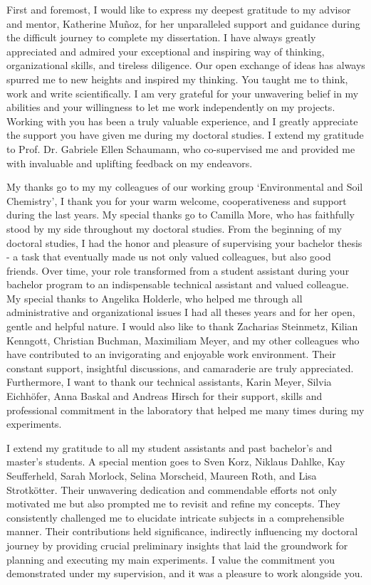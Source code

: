 \begin{acknowledgements}
\addchaptertocentry{\acknowledgementname} %
First and foremost, I would like to express my deepest gratitude to my advisor and mentor, Katherine Muñoz, for her unparalleled support and guidance during the difficult journey to complete my dissertation. I have always greatly appreciated and admired your exceptional and inspiring way of thinking, organizational skills, and tireless diligence. Our open exchange of ideas has always spurred me to new heights and inspired my thinking. You taught me to think, work and write scientifically. I am very grateful for your unwavering belief in my abilities and your willingness to let me work independently on my projects. Working with you has been a truly valuable experience, and I greatly appreciate the support you have given me during my doctoral studies. I extend my gratitude to Prof. Dr. Gabriele Ellen Schaumann, who co-supervised me and provided me with invaluable and uplifting feedback on my endeavors.


My thanks go to my my colleagues of our working group ‘Environmental and Soil Chemistry’, I thank you for your warm welcome, cooperativeness and support during the last years. My special thanks go to Camilla More, who has faithfully stood by my side throughout my doctoral studies. From the beginning of my doctoral studies, I had the honor and pleasure of supervising your bachelor thesis - a task that eventually made us not only valued colleagues, but also good friends. Over time, your role transformed from a student assistant during your bachelor program to an indispensable technical assistant and valued colleague. My special thanks to Angelika Holderle, who helped me through all administrative and organizational issues I had all theses years and for her open, gentle and helpful nature. I would also like to thank Zacharias Steinmetz, Kilian Kenngott, Christian Buchman, Maximiliam Meyer, and my other colleagues who have contributed to an invigorating and enjoyable work environment. Their constant support, insightful discussions, and camaraderie are truly appreciated. Furthermore, I want to thank our technical assistants, Karin Meyer, Silvia Eichhöfer, Anna Baskal and Andreas Hirsch for their support, skills and professional commitment in the laboratory that helped me many times during my experiments.


I extend my gratitude to all my student assistants and past bachelor's and master's students. A special mention goes to Sven Korz, Niklaus Dahlke, Kay Seufferheld, Sarah Morlock, Selina Morscheid, Maureen Roth, and Lisa Strotkötter. Their unwavering dedication and commendable efforts not only motivated me but also prompted me to revisit and refine my concepts. They consistently challenged me to elucidate intricate subjects in a comprehensible manner. Their contributions held significance, indirectly influencing my doctoral journey by providing crucial preliminary insights that laid the groundwork for planning and executing my main experiments. I value the commitment you demonstrated under my supervision, and it was a pleasure to work alongside you.



\end{acknowledgements}
